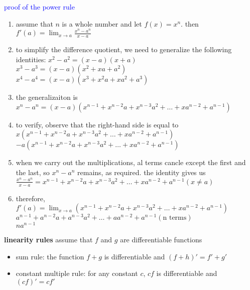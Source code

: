 \documentclass{article}
\begin{document}
\textcolor{blue}{proof of the power rule}
	\begin{enumerate}
		\item assume that $n$ is a whole number and let $f(x) = x^n$. then $f'(a) = \lim_{x \to a}\frac{x^n - a^n}{x - a}$
		\item to simplify the difference quotient, we need to generalize the following identities: $x^2 - a^2 = (x - a)(x + a)$\\ $x^3 - a^3 = (x - a)(x^2 + xa + a^2)$\\ $x^4 - a^4 = (x - a)(x^3 + x^2a + xa^2 + a^3)$
		\item the generalizaiton is $x^n - a^n = (x - a)(x^{n - 1} + x^{n - 2}a + x^{n - 3}a^2 + \ldots + xa^{n - 2} + a^{n - 1})$
		\item to verify, observe that the right-hand side is equal to\\ $x(x^{n - 1} + x^{n - 2}a + x^{n - 3}a^2 + \ldots + xa^{n - 2} + a^{n - 1})$\\$-a(x^{n - 1} + x^{n - 2}a + x^{n - 3}a^2 + \ldots + xa^{n - 2} + a^{n - 1})$
		\item when we carry out the multiplications, al terms cancle except the first and the last, so $x^n - a^n$ remains, as required. the identity gives us\\ $\frac{x^n - a^n}{x - a} = x^{n - 1} + x^{n - 2}a + x^{n - 3}a^2 + \ldots + xa^{n - 2} + a^{n - 1} (x \neq a)$
		\item therefore,\\ $f'(a) = \lim_{x \to a}(x^{n - 1} + x^{n - 2}a + x^{n - 3}a^2 + \ldots + xa^{n - 2} + a^{n - 1})$\\ $a^{n - 1} + a^{n - 2}a + a^{n - 3}a^2 + \ldots + aa^{n - 2} + a^{n - 1} (\text{n terms})$\\ $na^{n - 1}$
	\end{enumerate}

\textbf{linearity rules} assume that $f$ and $g$ are differentiable functions
	\begin{itemize}
		\item sum rule: the function $f + g$ is differentiable and $(f + h)' = f' + g'$
		\item constant multiple rule: for any constant $c$, $cf$ is differentiable and $(cf)' = cf'$
	\end{itemize}
\end{document}
